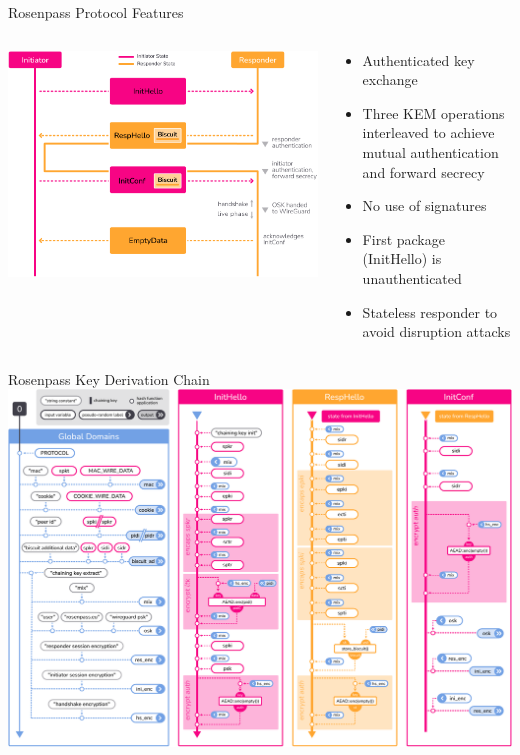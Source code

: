 




\begin{frame}{Rosenpass Protocol Features}
\hypertarget{the-rosenpass-protocol-1}{}
  \begin{columns}[fullwidth,c]
    \begin{column}{.6\linewidth}
      \includegraphics[width=\linewidth]{graphics/rosenpass-wp-key-exchange-protocol-rgb.pdf}
    \end{column}

    \begin{column}{.4\linewidth}
      \begin{itemize}
        \item Authenticated key exchange
        \item Three KEM operations interleaved to achieve mutual authentication and forward secrecy
        \item No use of signatures
        \item First package (InitHello) is unauthenticated
        \item Stateless responder to avoid disruption attacks
      \end{itemize}
    \end{column}
  \end{columns}
\end{frame}





\begin{frame}{Rosenpass Key Derivation Chain}
  \hypertarget{rosenpass-kdf-chain}{}
  \centering
  \includegraphics[height=.85\textheight]{graphics/rosenpass-wp-hashing-tree-rgb.pdf}
\end{frame}
